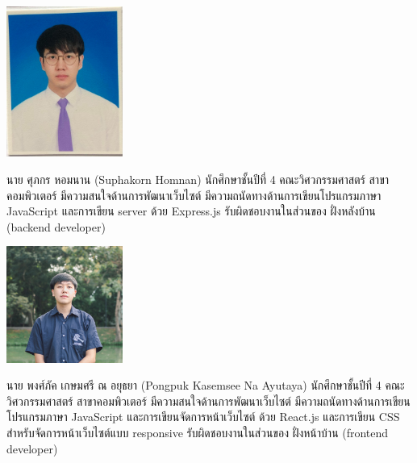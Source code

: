 \documentclass[semifinal]{cpecmu}
\author{นายพงศ์ภัค เกษมศรี ณ อยุธยา}{Pongpuk Kasemsee Na Ayutaya}{600610754}
\author{นายศุภกร หอมนาน}{Suphakorn Homnan}{600610782}
\begin{document}


\pagestyle{empty}\cleardoublepage
\normalspacing \setcounter{page}{1}  \pagestyle{cpecmu}






\ifproject

\fi



\ifproject
\appendix


\ifglossary\glossarypage\fi

\ifindex\indexpage\fi

\begin{biosketch}
\begin{center}
  \includegraphics[width=1.5in]{images/resume_profile.jpeg}
\end{center}
นาย ศุภกร หอมนาน (Suphakorn Homnan) 
นักศึกษาชั้นปีที่ 4 คณะวิศวกรรมศาสตร์ สาขาคอมพิวเตอร์
มีความสนใจด้านการพัฒนาเว็บไซต์ มีความถนัดทางด้านการเขียนโปรแกรมภาษา JavaScript และการเขียน server 
ด้วย Express.js 
รับผิดชอบงานในส่วนของ ฝั่งหลังบ้าน (backend developer)

\begin{center}
  \includegraphics[width=1.5in]{images/bright.jpeg}
\end{center}
นาย พงศ์ภัค เกษมศรี ณ อยุธยา (Pongpuk Kasemsee Na Ayutaya) 
นักศึกษาชั้นปีที่ 4 คณะวิศวกรรมศาสตร์ สาขาคอมพิวเตอร์
มีความสนใจด้านการพัฒนาเว็บไซต์ มีความถนัดทางด้านการเขียนโปรแกรมภาษา JavaScript และการเขียนจัดการหน้าเว็บไซต์ 
ด้วย React.js และการเขียน CSS สำหรับจัดการหน้าเว็บไซต์แบบ responsive
รับผิดชอบงานในส่วนของ ฝั่งหน้าบ้าน (frontend developer)
\end{biosketch}
\fi %
\end{document}

